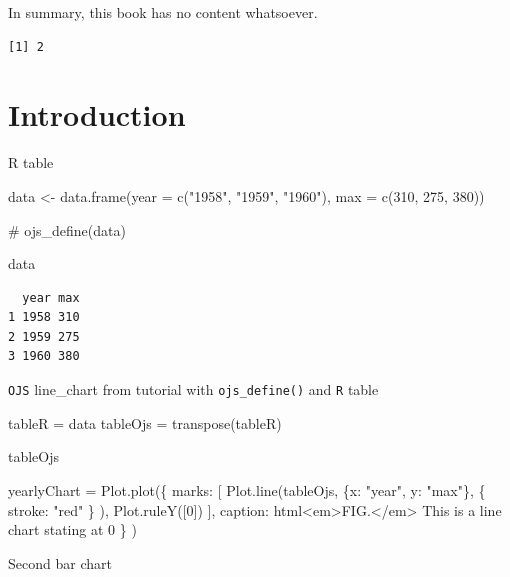 \documentclass[
  a4paper,
]{scrbook}
\newenvironment{Shaded}{}{}
\newcommand{\AttributeTok}[1]{\textcolor[rgb]{0.84,0.23,0.29}{#1}}
\newcommand{\CommentTok}[1]{\textcolor[rgb]{0.42,0.45,0.49}{#1}}
\newcommand{\DecValTok}[1]{\textcolor[rgb]{0.00,0.36,0.77}{#1}}
\newcommand{\FunctionTok}[1]{\textcolor[rgb]{0.44,0.26,0.76}{#1}}
\newcommand{\NormalTok}[1]{\textcolor[rgb]{0.14,0.16,0.18}{#1}}
\newcommand{\OtherTok}[1]{\textcolor[rgb]{0.44,0.26,0.76}{#1}}
\newcommand{\StringTok}[1]{\textcolor[rgb]{0.01,0.18,0.38}{#1}}
\begin{document}
In summary, this book has no content whatsoever.

\begin{verbatim}
[1] 2
\end{verbatim}

\hypertarget{introduction}{%
\chapter{Introduction}\label{introduction}}

R table

\begin{Shaded}
\begin{Highlighting}[numbers=left,,]
\NormalTok{data }\OtherTok{\textless{}{-}} \FunctionTok{data.frame}\NormalTok{(}\AttributeTok{year =}  \FunctionTok{c}\NormalTok{(}\StringTok{"1958"}\NormalTok{, }\StringTok{"1959"}\NormalTok{, }\StringTok{"1960"}\NormalTok{), }
                   \AttributeTok{max =} \FunctionTok{c}\NormalTok{(}\DecValTok{310}\NormalTok{, }\DecValTok{275}\NormalTok{, }\DecValTok{380}\NormalTok{))}


\CommentTok{\# ojs\_define(data)}

\NormalTok{data}
\end{Highlighting}
\end{Shaded}

\begin{verbatim}
  year max
1 1958 310
2 1959 275
3 1960 380
\end{verbatim}

\texttt{OJS} line\_chart from tutorial with \texttt{ojs\_define()} and
\texttt{R} table

\begin{Shaded}
\begin{Highlighting}[numbers=left,,]
\NormalTok{tableR = data}
\NormalTok{tableOjs = transpose(tableR)}

\NormalTok{tableOjs}

\NormalTok{yearlyChart = Plot.plot(\{}
\NormalTok{  marks: [}
\NormalTok{    Plot.line(tableOjs, }
\NormalTok{      \{x: "year", y: "max"\}, }
\NormalTok{      \{ stroke: "red" \}}
\NormalTok{    ),}
\NormalTok{    Plot.ruleY([0])}
\NormalTok{  ],}
\NormalTok{  caption: html\textasciigrave{}\textless{}em\textgreater{}FIG.\textless{}/em\textgreater{} This is a line chart stating at 0\textasciigrave{}}
\NormalTok{  \}}
\NormalTok{)}
\end{Highlighting}
\end{Shaded}

Second bar chart
\end{document}
